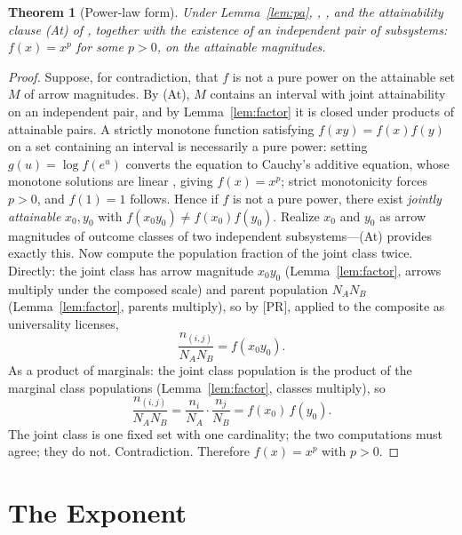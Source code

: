 \documentclass[11pt]{article}
\newtheorem{theorem}{Theorem}
\theoremstyle{definition}
\theoremstyle{remark}
\begin{document}
\begin{theorem}[Power-law form]\label{thm:power}
Under Lemma~\ref{lem:pa}, {\upshape[AS]}, {\upshape[PR]}, and the attainability clause {\upshape(At)} of {\upshape[LC]}, together with the existence of an independent pair of subsystems: $f(x) = x^p$ for some $p > 0$, on the attainable magnitudes.
\end{theorem}
\begin{proof}
Suppose, for contradiction, that $f$ is not a pure power on the attainable set $M$ of arrow magnitudes. By (At), $M$ contains an interval with joint attainability on an independent pair, and by Lemma~\ref{lem:factor} it is closed under products of attainable pairs. A strictly monotone function satisfying $f(xy) = f(x)f(y)$ on a set containing an interval is necessarily a pure power: setting $g(u) = \log f(e^u)$ converts the equation to Cauchy's additive equation, whose monotone solutions are linear \cite{Aczel1966}, giving $f(x) = x^p$; strict monotonicity forces $p > 0$, and $f(1) = 1$ follows. Hence if $f$ is not a pure power, there exist \emph{jointly attainable} $x_0, y_0$ with $f(x_0 y_0) \neq f(x_0) f(y_0)$. Realize $x_0$ and $y_0$ as arrow magnitudes of outcome classes of two independent subsystems---(At) provides exactly this. Now compute the population fraction of the joint class twice. Directly: the joint class has arrow magnitude $x_0 y_0$ (Lemma~\ref{lem:factor}, arrows multiply under the composed scale) and parent population $N_A N_B$ (Lemma~\ref{lem:factor}, parents multiply), so by [PR], applied to the composite as universality licenses,
\[ \frac{n_{(i,j)}}{N_A N_B} = f(x_0 y_0). \]
As a product of marginals: the joint class population is the product of the marginal class populations (Lemma~\ref{lem:factor}, classes multiply), so
\[ \frac{n_{(i,j)}}{N_A N_B} = \frac{n_i}{N_A}\cdot\frac{n_j}{N_B} = f(x_0)\, f(y_0). \]
The joint class is one fixed set with one cardinality; the two computations must agree; they do not. Contradiction. Therefore $f(x) = x^p$ with $p > 0$.
\end{proof}

\section{The Exponent}\label{sec:exponent}
\end{document}
